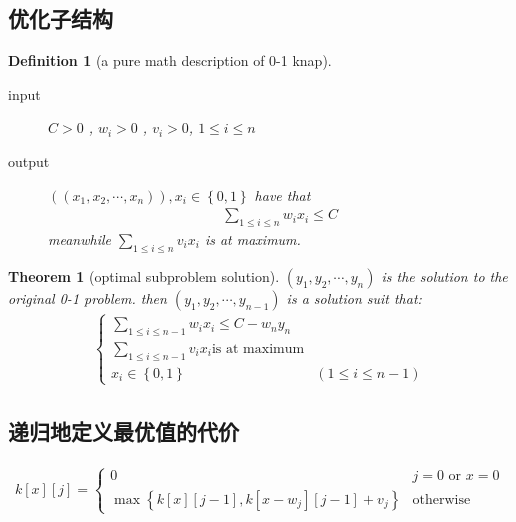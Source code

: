 \documentclass[a4paper, 10pt]{ctexart} %
\newtheorem{theorem}{Theorem}
\newtheorem{definition}{Definition}
\begin{document}
\subsection{优化子结构}
\begin{definition}[a pure math description of 0-1 knap]
    \begin{description}
        \item[input] $C >0 $ , $w_{i} >0$ , $v _{i} > 0$, $1 \le i\le n$
        \item[output] $(\left(x_{1 }, x_2 ,\cdots ,x_{n}\right)), x_{i} \in \left\{ 0 ,1\right\}$ have that 
        \begin{align*}
            \sum_{1 \le i \le n}  w_{i} x_{i} \le C
        \end{align*}
        meanwhile $\displaystyle \sum_{1 \le i \le n}  v_{i}x_{i}$ is at maximum.
    \end{description}
\end{definition}
\begin{theorem}[optimal subproblem solution]
    $\left( y_1 , y_2 , \cdots  , y_{n}\right)$ is the solution to the original 0-1 problem.
    then $\left( y_1 , y_2 ,\cdots ,y_{n-1}\right)$ is a solution suit that:
    \begin{align*}
        \begin{cases}
            \displaystyle \sum_{1 \le i \le n -1}  w_{i} x_{i} \le C - w_{n} y_{n}\\
            \displaystyle \sum_{1 \le i \le n-1}  v_{i} x_{i} \text{is at maximum}\\
            x_{i} \in \left\{  0 ,1\right\} & \left( 1\le i \le n - 1\right)
        \end{cases}
    \end{align*}
\end{theorem}
\subsection{递归地定义最优值的代价}
\begin{align*}
    k \left[ x \right]\left[ j \right] = 
    \begin{cases}
        0 & j = 0 \text{ or } x = 0\\
        \max_{}  \left\{
            k\left[ x \right][j-1],k[x-w_{j}][j -1]+v_{j}
        \right\} & \text{otherwise}
    \end{cases}
\end{align*}
\end{document}
